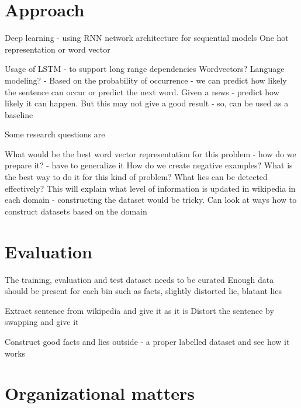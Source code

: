 \documentclass[a4paper, 11pt]{article}
\begin{document}
\section{Approach}

Deep learning - using RNN network architecture for sequential models
One hot representation or word vector

Usage of LSTM - to support long range dependencies
Wordvectors? 
Language modeling? - Based on the probability of occurrence - we can predict how likely the sentence can occur or predict the next word. Given a news - predict how likely it can happen. But this may  not give a good result - so, can be used as a baseline

Some research questions are

What would be the best word vector representation for this problem - how do we prepare it? - have to generalize it
How do we create negative examples? What is the best way to do it for this kind of problem?
What lies can be detected effectively? This will explain what level of information is updated in wikipedia in each domain - constructing the dataset would be tricky. Can look at ways how to construct datasets based on the domain


\section{Evaluation}

The training, evaluation and test dataset needs to be curated
Enough data should be present for each bin such as facts, slightly distorted lie, blatant lies 

Extract sentence from wikipedia and give it as it is
Distort the sentence by swapping and give it 

Construct good facts and lies outside - a proper labelled dataset and see how it works
\newpage

\section{Organizational matters}
\end{document}
